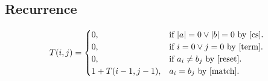 \documentclass{article}
\begin{document}
	\subsection{Recurrence}
	 \begin{equation}
	T(i, j)=			
	\begin{cases}
	0, & \text{if $|a|=0 \vee |b|=0$ by \ref{cs}}.\\
	0, & \text{if $i=0 \vee j=0$ by \ref{term}}.\\	
	0, & \text{if } a_i \neq b_j \text{ by \ref{reset}}.\\
	1+T(i-1,j-1), & \text{$a_i = b_j$ by \ref{match}}.				
	\end{cases}
	\end{equation}
\end{document}

